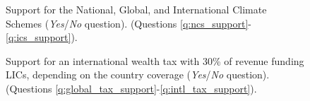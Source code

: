 \documentclass[12pt,english]{article}
\begin{document}
\begin{bibunit}
\begin{figure}
\begin{subfigure}{.38\textwidth}
  \end{subfigure}
\end{figure}
\begin{figure}[h!]
    \caption[Support for the NCS, GCS, ICS]{Support for the National, Global, and International Climate Schemes (\textit{Yes}/\textit{No} question). \hfill (Questions \ref{q:ncs_support}-\ref{q:ics_support}).
    }\label{fig:ics}
\end{figure}
\begin{figure}[h!]
    \caption[Support for an international wealth depending on country coverage]{Support for an international wealth tax with 30\% of revenue funding LICs, depending on the country coverage (\textit{Yes}/\textit{No} question). \hfill (Questions \ref{q:global_tax_support}-\ref{q:intl_tax_support}).
    }\label{fig:wealth_tax}
\end{figure}
    \begin{figure}

\end{figure}
\end{bibunit}
\end{document}
